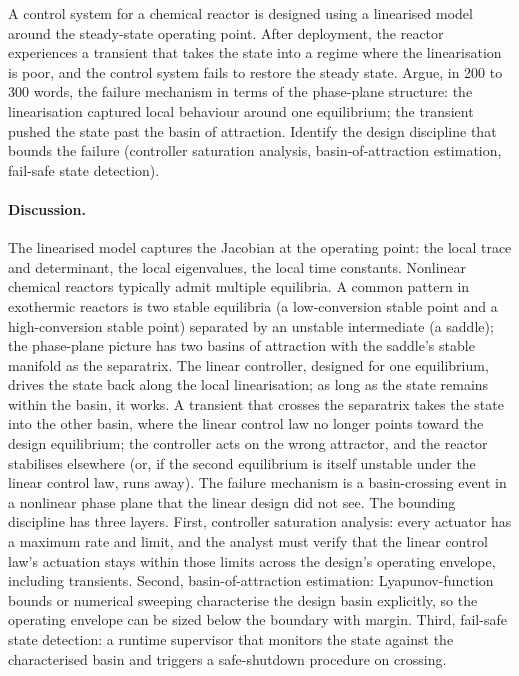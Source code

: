 \begin{exercise}
A control system for a chemical reactor is designed using a
linearised model around the steady-state operating point. After
deployment, the reactor experiences a transient that takes the
state into a regime where the linearisation is poor, and the
control system fails to restore the steady state. Argue, in
200 to 300 words, the failure mechanism in terms of the
phase-plane structure: the linearisation captured local
behaviour around one equilibrium; the transient pushed the
state past the basin of attraction. Identify the design
discipline that bounds the failure (controller saturation
analysis, basin-of-attraction estimation, fail-safe state
detection).

\paragraph{Discussion.} The linearised model captures the
Jacobian at the operating point: the local trace and
determinant, the local eigenvalues, the local time constants.
Nonlinear chemical reactors typically admit multiple
equilibria. A common pattern in exothermic reactors is two
stable equilibria (a low-conversion stable point and a
high-conversion stable point) separated by an unstable
intermediate (a saddle); the phase-plane picture has two
basins of attraction with the saddle's stable manifold as the
separatrix. The linear controller, designed for one
equilibrium, drives the state back along the local
linearisation; as long as the state remains within the basin,
it works. A transient that crosses the separatrix takes the
state into the other basin, where the linear control law no
longer points toward the design equilibrium; the controller
acts on the wrong attractor, and the reactor stabilises
elsewhere (or, if the second equilibrium is itself unstable
under the linear control law, runs away). The failure mechanism
is a basin-crossing event in a nonlinear phase plane that the
linear design did not see. The bounding discipline has three
layers. First, controller saturation analysis: every actuator
has a maximum rate and limit, and the analyst must verify that
the linear control law's actuation stays within those limits
across the design's operating envelope, including transients.
Second, basin-of-attraction estimation: Lyapunov-function
bounds or numerical sweeping characterise the design basin
explicitly, so the operating envelope can be sized below the
boundary with margin. Third, fail-safe state detection: a
runtime supervisor that monitors the state against the
characterised basin and triggers a safe-shutdown procedure on
crossing.
\end{exercise}

